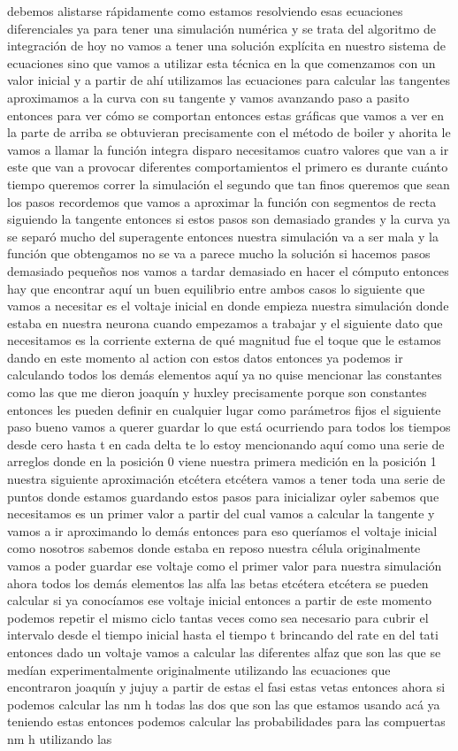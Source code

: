 debemos alistarse rápidamente como estamos resolviendo esas ecuaciones diferenciales ya para tener una simulación numérica y se trata del algoritmo de integración de hoy no vamos a tener una solución explícita en nuestro sistema de ecuaciones sino que vamos a utilizar esta técnica en la que comenzamos con un valor inicial y a partir de ahí utilizamos las ecuaciones para calcular las tangentes aproximamos a la curva con su tangente y vamos avanzando paso a pasito entonces para ver cómo se comportan entonces estas gráficas que vamos a ver en la parte de arriba se obtuvieran precisamente con el método de boiler y ahorita le vamos a llamar la función integra disparo necesitamos cuatro valores que van a ir este que van a provocar diferentes comportamientos el primero es durante cuánto tiempo queremos correr la simulación el segundo que tan finos queremos que sean los pasos recordemos que vamos a aproximar la función con segmentos de recta siguiendo la tangente entonces si estos pasos son demasiado grandes y la curva ya se separó mucho del superagente entonces nuestra simulación va a ser mala y la función que obtengamos no se va a parece mucho la solución si hacemos pasos demasiado pequeños nos vamos a tardar demasiado en hacer el cómputo entonces hay que encontrar aquí un buen equilibrio entre ambos casos lo siguiente que vamos a necesitar es el voltaje inicial en donde empieza nuestra simulación donde estaba en nuestra neurona cuando empezamos a trabajar y el siguiente dato que necesitamos es la corriente externa de qué magnitud fue el toque que le estamos dando en este momento al action con estos datos entonces ya podemos ir calculando todos los demás elementos aquí ya no quise mencionar las constantes como las que me dieron joaquín y huxley precisamente porque son constantes entonces les pueden definir en cualquier lugar como parámetros fijos el siguiente paso bueno vamos a querer guardar lo que está ocurriendo para todos los tiempos desde cero hasta t en cada delta te lo estoy mencionando aquí como una serie de arreglos donde en la posición 0 viene nuestra primera medición en la posición 1 nuestra siguiente aproximación etcétera etcétera vamos a tener toda una serie de puntos donde estamos guardando estos pasos para inicializar oyler sabemos que necesitamos es un primer valor a partir del cual vamos a calcular la tangente y vamos a ir aproximando lo demás entonces para eso queríamos el voltaje inicial como nosotros sabemos donde estaba en reposo nuestra célula originalmente vamos a poder guardar ese voltaje como el primer valor para nuestra simulación ahora todos los demás elementos las alfa las betas etcétera etcétera se pueden calcular si ya conocíamos ese voltaje inicial entonces a partir de este momento podemos repetir el mismo ciclo tantas veces como sea necesario para cubrir el intervalo desde el tiempo inicial hasta el tiempo t brincando del rate en del tati entonces dado un voltaje vamos a calcular las diferentes alfaz que son las que se medían experimentalmente originalmente utilizando las ecuaciones que encontraron joaquín y jujuy a partir de estas el fasi estas vetas entonces ahora si podemos calcular las nm h todas las dos que son las que estamos usando acá ya teniendo estas entonces podemos calcular las probabilidades para las compuertas nm h utilizando las 